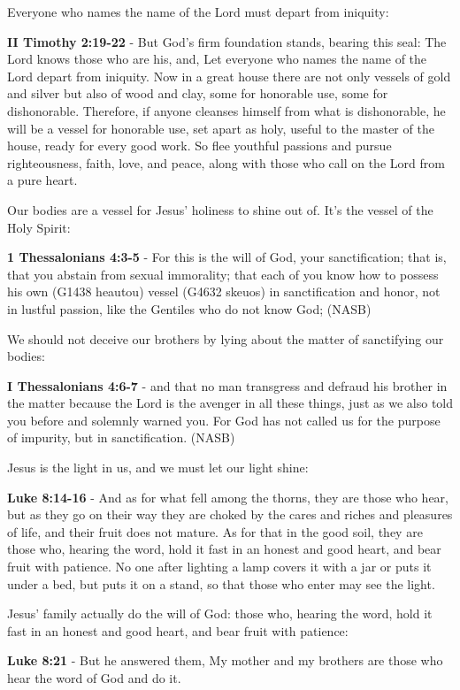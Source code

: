 \documentclass[11pt]{article}
\begin{document}
Everyone who names the name of the Lord must depart from iniquity:

\textbf{II Timothy 2:19-22} - But God's firm foundation stands, bearing this seal: The Lord knows those who are his, and, Let everyone who names the name of the Lord depart from iniquity. Now in a great house there are not only vessels of gold and silver but also of wood and clay, some for honorable use, some for dishonorable. Therefore, if anyone cleanses himself from what is dishonorable, he will be a vessel for honorable use, set apart as holy, useful to the master of the house, ready for every good work. So flee youthful passions and pursue righteousness, faith, love, and peace, along with those who call on the Lord from a pure heart.

Our bodies are a vessel for Jesus' holiness to shine out of. It's the vessel of the Holy Spirit:

\textbf{1 Thessalonians 4:3-5} - For this is the will of God, your sanctification; that is, that you abstain from sexual immorality; that each of you know how to possess his own (G1438 heautou) vessel (G4632 skeuos) in sanctification and honor, not in lustful passion, like the Gentiles who do not know God; (NASB)

We should not deceive our brothers by lying about the matter of sanctifying our bodies:

\textbf{I Thessalonians 4:6-7} - and that no man transgress and defraud his brother in the matter because the Lord is the avenger in all these things, just as we also told you before and solemnly warned you.
For God has not called us for the purpose of impurity, but in sanctification. (NASB)

Jesus is the light in us, and we must let our light shine:

\textbf{Luke 8:14-16} - And as for what fell among the thorns, they are those who hear, but as they go on their way they are choked by the cares and riches and pleasures of life, and their fruit does not mature.
As for that in the good soil, they are those who, hearing the word, hold it fast in an honest and good heart, and bear fruit with patience. No one after lighting a lamp covers it with a jar or puts it under a bed, but puts it on a stand, so that those who enter may see the light.

Jesus' family actually do the will of God: those who, hearing the word, hold it fast in an honest and good heart, and bear fruit with patience:

\textbf{Luke 8:21} - But he answered them, My mother and my brothers are those who hear the word of God and do it.
\end{document}
